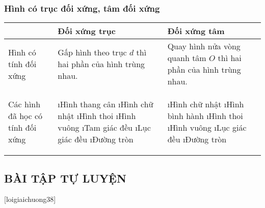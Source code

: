 \subsubsection{Hình có trục đối xứng, tâm đối xứng}

\begin{tabular}{|p{}|p{}|p{}|}
	\hline
	&Đối xứng trục&Đối xứng tâm\\
	\hline
	Hình có tính đối xứng&	 
	Gấp hình theo trục $d$ thì hai phần của hình trùng nhau.&	 
	Quay hình nửa vòng quanh tâm $O$ thì hai phần của hình trùng nhau.\\
	\hline
	Các hình đã học có tính đối xứng& \begin{enumerate}[--, leftmargin=*]
		\i Hình thang cân
		\i Hình chữ nhật
		\i Hình thoi
		\i Hình vuông
		\i Tam giác đều
		\i Lục giác đều
		\i Đường tròn
	\end{enumerate}&
	\begin{enumerate}[--, leftmargin=*]
		\i Hình chữ nhật
		\i Hình bình hành
		\i Hình thoi
		\i Hình vuông
		\i Lục giác đều
		\i Đường tròn
	\end{enumerate}\\
	\hline
\end{tabular}
\subsection{BÀI TẬP TỰ LUYỆN}
[loigiaichuong38]
